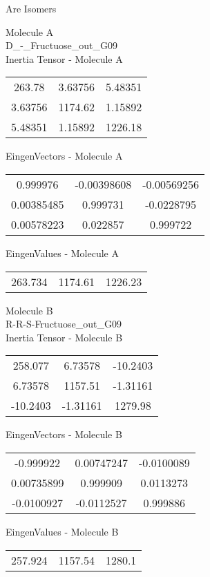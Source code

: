 \begin{center}
\vtab
\vtab
\textcolor{NavyBlue}{\Large Are Isomers}
\end{center}
\newpage
\begin{multicols}{2}
\begin{center}
Molecule A \\ 
D\_-\_Fructuose\_out\_G09
\\
Inertia Tensor - Molecule A \\
\vtab
\begin{tabular}{|c c c|}
263.78	 & 	3.63756	 & 	5.48351	 \\
3.63756	 & 	1174.62	 & 	1.15892	 \\
5.48351	 & 	1.15892	 & 	1226.18
\end{tabular}

\vtab
 EingenVectors - Molecule A     \\
\vtab
\begin{tabular}{|c c c|}
0.999976	 & 	-0.00398608	 & 	-0.00569256	 \\
0.00385485	 & 	0.999731	 & 	-0.0228795	 \\
0.00578223	 & 	0.022857	 & 	0.999722
\end{tabular}

\vtab
 EingenValues - Molecule A     \\
\vtab
\begin{tabular}{|c c c|}
263.734	 & 	1174.61	 & 	1226.23
\end{tabular}
\columnbreak

Molecule B \\ 
R-R-S-Fructuose\_out\_G09
\\
Inertia Tensor - Molecule B \\
\vtab
\begin{tabular}{|c c c|}
258.077	 & 	6.73578	 & 	-10.2403	 \\
6.73578	 & 	1157.51	 & 	-1.31161	 \\
-10.2403	 & 	-1.31161	 & 	1279.98
\end{tabular}

\vtab
 EingenVectors - Molecule B     \\
\vtab
\begin{tabular}{|c c c|}
-0.999922	 & 	0.00747247	 & 	-0.0100089	 \\
0.00735899	 & 	0.999909	 & 	0.0113273	 \\
-0.0100927	 & 	-0.0112527	 & 	0.999886
\end{tabular}

\vtab
 EingenValues - Molecule B     \\
\vtab
\begin{tabular}{|c c c|}
257.924	 & 	1157.54	 & 	1280.1
\end{tabular}

\end{center}
\end{multicols}
